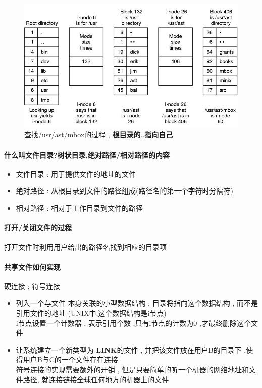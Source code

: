 \documentclass[UTF8,a4paper]{ctexart}
\begin{document}
\begin{figure}[H]
	\centering
	\includegraphics[scale = 0.6]{assets/ModernOperatingSystems/2018-01-08-19-50-18.png}
	\caption{查找/usr/ast/mbox的过程 , \textbf{根目录的$..$指向自己}}
\end{figure}

\paragraph{什么叫文件目录?树状目录,绝对路径/相对路径的内容} 
\begin{itemize}
	\item 文件目录 : 用于提供文件的地址的文件
	\item 绝对路径 : 从根目录到文件的路径组成(路径名的第一个字符时分隔符)
	\item 相对路径 : 相对于工作目录到文件的路径
\end{itemize}

\paragraph{打开/关闭文件的过程}
 打开文件时利用用户给出的路径名找到相应的目录项

 \paragraph{共享文件如何实现}硬连接  ; 符号连接
 \begin{itemize}
	\item 列入一个与文件 本身关联的小型数据结构 , 目录将指向这个数据结构 , 而不是引用文件的地址 (UNIX中,这个数据结构是i节点)\\
	      i节点设置一个计数器 , 表示引用个数 ,只有i节点的计数为0  ,才最终删除这个文件
	\item 让系统建立一个新类型为 \textbf{LINK}的文件 , 并把该文件放在用户B的目录下 ,使得用户B与C的一个文件存在连接 \\
	      符号连接的实现需要额外的开销 , 但是只要简单的听一个机器的网络地址和文件路径, 就连接链接全球任何地方的机器上的文件
\end{itemize}
\end{document}
